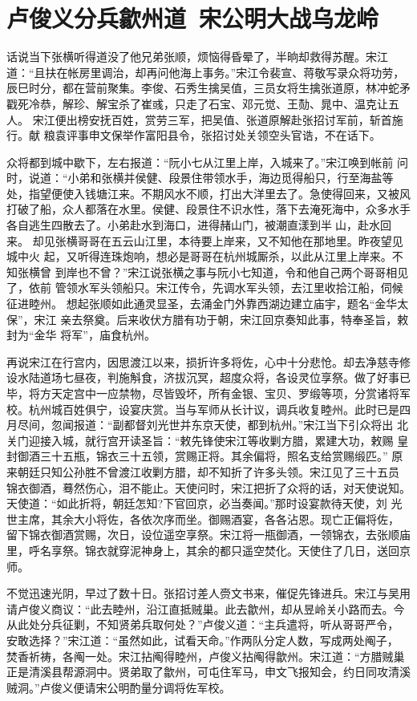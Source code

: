 \chapter{卢俊义分兵歙州道~宋公明大战乌龙岭}

话说当下张横听得道没了他兄弟张顺，烦恼得昏晕了，半晌却救得苏醒。宋江
道：“且扶在帐房里调治，却再问他海上事务。”宋江令裴宣、蒋敬写录众将功劳，
辰巳时分，都在营前聚集。李俊、石秀生擒吴值，三员女将生擒张道原，林冲蛇矛
戳死冷恭，解珍、解宝杀了崔彧，只走了石宝、邓元觉、王𪟝、晁中、温克让五人。
宋江便出榜安抚百姓，赏劳三军，把吴值、张道原解赴张招讨军前，斩首施行。献
粮袁评事申文保举作富阳县令，张招讨处关领空头官诰，不在话下。

众将都到城中歇下，左右报道：“阮小七从江里上岸，入城来了。”宋江唤到帐前
问时，说道：“小弟和张横并侯健、段景住带领水手，海边觅得船只，行至海盐等
处，指望便使入钱塘江来。不期风水不顺，打出大洋里去了。急使得回来，又被风
打破了船，众人都落在水里。侯健、段景住不识水性，落下去淹死海中，众多水手
各自逃生四散去了。小弟赴水到海口，进得赭山门，被潮直漾到半山，赴水回来。
却见张横哥哥在五云山江里，本待要上岸来，又不知他在那地里。昨夜望见城中火
起，又听得连珠炮响，想必是哥哥在杭州城厮杀，以此从江里上岸来。不知张横曾
到岸也不曾？”宋江说张横之事与阮小七知道，令和他自己两个哥哥相见了，依前
管领水军头领船只。宋江传令，先调水军头领，去江里收拾江船，伺候征进睦州。
想起张顺如此通灵显圣，去涌金门外靠西湖边建立庙宇，题名“金华太保”，宋江
亲去祭奠。后来收伏方腊有功于朝，宋江回京奏知此事，特奉圣旨，敕封为“金华
将军”，庙食杭州。

再说宋江在行宫内，因思渡江以来，损折许多将佐，心中十分悲怆。却去净慈寺修
设水陆道场七昼夜，判施斛食，济拔沉冥，超度众将，各设灵位享祭。做了好事已
毕，将方天定宫中一应禁物，尽皆毁坏，所有金银、宝贝、罗缎等项，分赏诸将军
校。杭州城百姓俱宁，设宴庆赏。当与军师从长计议，调兵收复睦州。此时已是四
月尽间，忽闻报道：“副都督刘光世并东京天使，都到杭州。”宋江当下引众将出
北关门迎接入城，就行宫开读圣旨：“敕先锋使宋江等收剿方腊，累建大功，敕赐
皇封御酒三十五瓶，锦衣三十五领，赏赐正将。其余偏将，照名支给赏赐缎匹。”
原来朝廷只知公孙胜不曾渡江收剿方腊，却不知折了许多头领。宋江见了三十五员
锦衣御酒，蓦然伤心，泪不能止。天使问时，宋江把折了众将的话，对天使说知。
天使道：“如此折将，朝廷怎知?下官回京，必当奏闻。”那时设宴款待天使，刘
光世主席，其余大小将佐，各依次序而坐。御赐酒宴，各各沾恩。现亡正偏将佐，
留下锦衣御酒赏赐，次日，设位遥空享祭。宋江将一瓶御酒，一领锦衣，去张顺庙
里，呼名享祭。锦衣就穿泥神身上，其余的都只遥空焚化。天使住了几日，送回京
师。

不觉迅速光阴，早过了数十日。张招讨差人赍文书来，催促先锋进兵。宋江与吴用
请卢俊义商议：“此去睦州，沿江直抵贼巢。此去歙州，却从昱岭关小路而去。今
从此处分兵征剿，不知贤弟兵取何处？”卢俊义道：“主兵遣将，听从哥哥严令，
安敢选择？”宋江道：“虽然如此，试看天命。”作两队分定人数，写成两处阄子，
焚香祈祷，各阄一处。宋江拈阄得睦州，卢俊义拈阄得歙州。宋江道：“方腊贼巢
正是清溪县帮源洞中。贤弟取了歙州，可屯住军马，申文飞报知会，约日同攻清溪
贼洞。”卢俊义便请宋公明酌量分调将佐军校。


